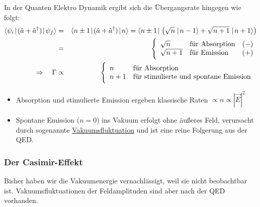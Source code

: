 In der Quanten Elektro Dynamik ergibt sich die Übergangsrate hingegen wie folgt: 
\begin{eqnarray*}
\bracket{\psi_i}{ (\hat{a}+\hat{a}^\dagger)}{\psi_f} &=&  \bracket{n\pm1}{(\hat{a}+\hat{a}^\dagger)}{n} = \bra{n\pm1}\big(\sqrt{n} \ket{n-1}+ \sqrt{n+1} \ket{n+1}\big)
\\
&=& \Bigg \{ \begin{array}{llc} \sqrt{n} & \text{für Absorption} & (-) \\ \sqrt{n+1} & \text{für Emission}& (+) \end{array}
\\
\Rightarrow\quad \Gamma &\propto& \Bigg \{ \begin{array}{ll} n &\text{für Absorption}\\ n+1 &\text{für stimulierte und spontane Emission }\end{array}
\end{eqnarray*}
\begin{itemize}
\item Absorption und stimulierte Emission ergeben klassische Raten $\propto n\propto |\vec{E}|^2$
\item Spontane Emission ($n=0$) ins Vakuum erfolgt ohne äußeres Feld, verursacht durch sogenannte \underline{Vakuumsfluktuation} und ist eine reine Folgerung aus der QED. 
\end{itemize}


\subsubsection{Der Casimir-Effekt}
Bisher haben wir die Vakuumenergie vernachlässigt, weil sie nicht beobachtbar ist. Vakuumsfluktuationen der Feldamplituden sind aber nach der QED vorhanden.

